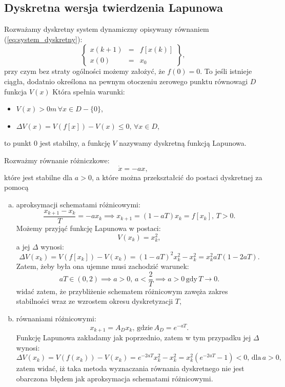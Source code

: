 \documentclass{article}
\begin{document}
    \subsection{Dyskretna wersja twierdzenia Lapunowa}
    Rozważamy dyskretny system dynamiczny opisywany równaniem (\ref{eq:system_dyskretny}):
    \begin{equation}
        \label{eq:system_dyskretny}
        \left\{
        \begin{array}{rcl}
            x(k+1)  &   =   &   f[x(k)]\\
            x(0)    &   =   & x_{0}
        \end{array}
        \right\},
    \end{equation}
    przy czym bez straty ogólności możemy założyć, że $f(0) = 0$.
    To jeśli istnieje ciągła, dodatnio określona na pewnym otoczeniu zerowego punktu równowagi $D$ funkcja $V(x)$
    Która spełnia warunki:
    \begin{itemize}
        \item $V(x) > 0m\, \forall x \in D - \{0\}$,
        \item $\Delta V(x) = V(f[x]) - V(x) \leq 0, \, \forall x\in D$,
    \end{itemize}
    to punkt $0$ jest stabilny, a funkcję $V$ nazywamy dyskretną funkcją Lapunowa.

    \begin{tcolorbox}[colback=green!5, colframe=green!75!black, title=Przykład]
    Rozważmy równanie różniczkowe:
    $$
        \dot{x} = -ax,
    $$
    które jest stabilne dla $a>0$, a które można przekształcić do postaci dyskretnej za pomocą
    \begin{enumerate}[(a)]
        \item aproksymacji schematami różnicowymi:
        $$
            \frac{x_{k+1}-x_{k}}{T} = -ax_{k} \implies x_{k+1} = (1-aT)x_{k} = f[x_{k}], \, T>0.
        $$
        Możemy przyjąć funkcję Lapunowa w postaci:
        $$
            V(x_{k}) = x_{k}^{2},
        $$
        a jej $\Delta$ wynosi:
        $$
            \Delta V(x_{k})
            =
            V(f[x_{k}]) - V(x_{k})
            =
            (1-aT)^{2}x_{k}^{2} - x_{k}^{2}
            =
            x_{k}^{2}aT(1-2aT).
        $$
        Zatem, żeby była ona ujemne musi zachodzić warunek:
        $$
            aT \in (0, 2) \implies a>0,\,a<\frac{2}{T} \implies a>0\,\text{gdy}\,T\rightarrow0.
        $$
        widać zatem, że przybliżenie schematem różnicowym zawęża zakres stabilności wraz ze wzrostem okresu dyskretyzacji $T$,

        \item równaniami różnicowymi:
        $$
            x_{k+1} = A_{D} x_{k},\,\text{gdzie}\,A_{D} = e^{-aT}.
        $$
        Funkcję Lapunowa zakładamy jak poprzednio, zatem w tym przypadku jej $\Delta$ wynosi:
        $$
            \Delta V(x_{k}) = V(f(x_{k})) - V(x_{k}) = e^{-2aT}x_{k}^{2} - x_{k}^{2} = x_{k}^{2}(e^{-2aT} -1) < 0,\,\text{dla}\, a>0,
        $$
        zatem widać, iż taka metoda wyznaczania równania dyskretnego nie jest obarczona błędem jak aproksymacja schematami różnicowymi.
    \end{enumerate}
    \end{tcolorbox}
\end{document}
